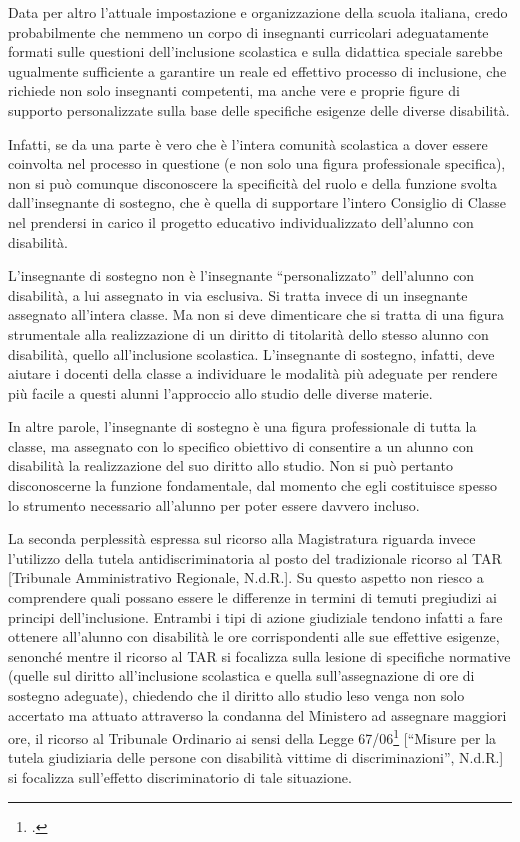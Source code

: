 Data per altro l'attuale impostazione e organizzazione della scuola italiana, credo probabilmente che nemmeno un corpo di insegnanti curricolari adeguatamente formati sulle questioni dell'inclusione scolastica e sulla didattica speciale sarebbe ugualmente sufficiente a garantire un reale ed effettivo processo di inclusione, che richiede non solo insegnanti competenti, ma anche vere e proprie figure di supporto personalizzate sulla base delle specifiche esigenze delle diverse disabilità.

Infatti, se da una parte è vero che è l'intera comunità scolastica a dover essere coinvolta nel processo in questione (e non solo una figura professionale specifica), non si può comunque disconoscere la specificità del ruolo e della funzione svolta dall'insegnante di sostegno, che è quella di supportare l'intero Consiglio di Classe nel prendersi in carico il progetto educativo individualizzato dell'alunno con disabilità.

L'insegnante di sostegno non è l'insegnante “personalizzato” dell'alunno con disabilità, a lui assegnato in via esclusiva. Si tratta invece di un insegnante assegnato all'intera classe. Ma non si deve dimenticare che si tratta di una figura strumentale alla realizzazione di un diritto di titolarità dello stesso alunno con disabilità, quello all'inclusione scolastica. L'insegnante di sostegno, infatti, deve aiutare i docenti della classe a individuare le modalità più adeguate per rendere più facile a questi alunni l'approccio allo studio delle diverse materie.

In altre parole, l'insegnante di sostegno è una figura professionale di tutta la classe, ma assegnato con lo specifico obiettivo di consentire a un alunno con disabilità la realizzazione del suo diritto allo studio. Non si può pertanto disconoscerne la funzione fondamentale, dal momento che egli costituisce spesso lo strumento necessario all'alunno per poter essere davvero incluso.

La seconda perplessità espressa sul ricorso alla Magistratura riguarda invece l'utilizzo della tutela antidiscriminatoria al posto del tradizionale ricorso al TAR [Tribunale Amministrativo Regionale, N.d.R.].
Su questo aspetto non riesco a comprendere quali possano essere le differenze in termini di temuti pregiudizi ai principi dell'inclusione. Entrambi i tipi di azione giudiziale tendono infatti a fare ottenere all'alunno con disabilità le ore corrispondenti alle sue effettive esigenze, senonché mentre il ricorso al TAR si focalizza sulla lesione di specifiche normative (quelle sul diritto all'inclusione scolastica e quella sull'assegnazione di ore di sostegno adeguate), chiedendo che il diritto allo studio leso venga non solo accertato ma attuato attraverso la condanna del Ministero ad assegnare maggiori ore, il ricorso al Tribunale Ordinario ai sensi della Legge 67/06\footcite{Legge_67_2006} [“Misure per la tutela giudiziaria delle persone con disabilità vittime di discriminazioni”, N.d.R.] si focalizza sull'effetto discriminatorio di tale situazione.

